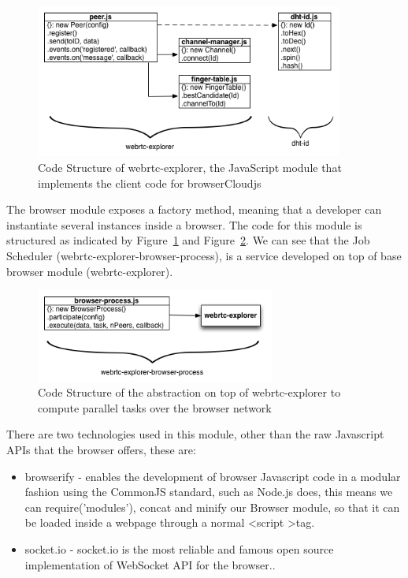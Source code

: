 \begin{figure}[h!]
  \centering
  \includegraphics[width=0.9\textwidth]{figs/diagram-webrtc-explorer}
  \caption{Code Structure of webrtc-explorer, the JavaScript module that implements the client code for browserCloudjs}
  \label{fig:d-w-e}
\end{figure}

The browser module exposes a factory method, meaning that a developer can instantiate several instances inside a browser. The code for this module is structured as indicated by Figure~\ref{fig:d-w-e} and Figure~\ref{fig:d-w-e-b-p}. We can see that the Job Scheduler (webrtc-explorer-browser-process), is a service developed on top of base browser module (webrtc-explorer).

\begin{figure}[h!]
  \centering
  \includegraphics[width=0.7\textwidth]{figs/diagram-webrtc-explorer-browser-process}
  \caption{Code Structure of the abstraction on top of webrtc-explorer to compute parallel tasks over the browser network}
  \label{fig:d-w-e-b-p}
\end{figure}

There are two technologies used in this module, other than the raw Javascript APIs that the browser offers, these are:

\begin{itemize}
    \item browserify - enables the development of browser Javascript code in a modular fashion using the CommonJS standard, such as Node.js does, this means we can require('modules'), concat and minify our Browser module, so that it can be loaded inside a webpage through a normal \textless script \textgreater tag.
    \item socket.io - socket.io is the most reliable and famous open source implementation of WebSocket API for the browser..
\end{itemize}

